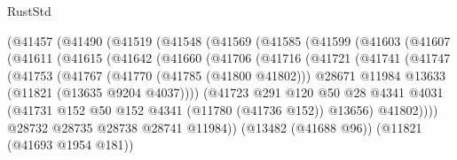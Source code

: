 \begin{lexlean}{RustStd}
\begin{coremodule}
                  (@41457
                    (@41490
                      (@41519
                        (@41548
                          (@41569
                            (@41585
                              (@41599
                                (@41603
                                  (@41607
                                    (@41611
                                      (@41615
                                        (@41642
                                          (@41660
                                            (@41706
                                              (@41716
                                                (@41721
                                                  (@41741
                                                    (@41747
                                                      (@41753
                                                        (@41767
                                                          (@41770 (@41785 (@41800 @41802)))
                                                          @28671
                                                          @11984
                                                          @13633
                                                          (@11821 (@13635 @9204 @4037))))
                                                      (@41723
                                                        @291
                                                        @120
                                                        @50
                                                        @28
                                                        @4341
                                                        @4031
                                                        (@41731
                                                          @152
                                                          @50
                                                          @152
                                                          @4341
                                                          (@11780 (@41736 @152))
                                                          @13656)
                                                        @41802))))
                                                @28732
                                                @28735
                                                @28738
                                                @28741
                                                @11984))
                                            (@13482 (@41688 @96))
                                            (@11821 (@41693 @1954 @181))

\end{coremodule}
\end{lexlean}
